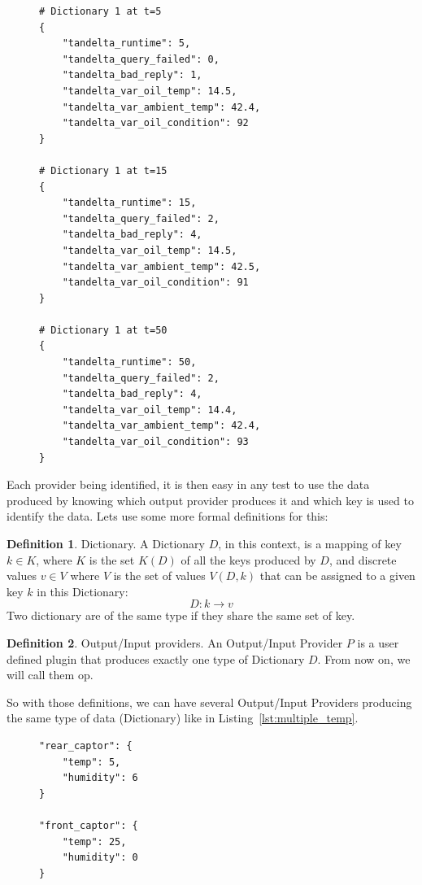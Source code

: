 \documentclass[12pt]{article}
\theoremstyle{definition}
\newtheorem{definition}{Definition}[section]
\theoremstyle{definition}
\theoremstyle{remark}
\begin{document}
\begin{figure}
\label{dictionary_sample}
\begin{lstlisting}[caption=Example of a data dictionnary received at different time.,label={lst:dictionary_sample}]
# Dictionary 1 at t=5
{
    "tandelta_runtime": 5,
    "tandelta_query_failed": 0,
    "tandelta_bad_reply": 1,
    "tandelta_var_oil_temp": 14.5,
    "tandelta_var_ambient_temp": 42.4,
    "tandelta_var_oil_condition": 92
}

# Dictionary 1 at t=15
{
    "tandelta_runtime": 15,
    "tandelta_query_failed": 2,
    "tandelta_bad_reply": 4,
    "tandelta_var_oil_temp": 14.5,
    "tandelta_var_ambient_temp": 42.5,
    "tandelta_var_oil_condition": 91
}

# Dictionary 1 at t=50
{
    "tandelta_runtime": 50,
    "tandelta_query_failed": 2,
    "tandelta_bad_reply": 4,
    "tandelta_var_oil_temp": 14.4,
    "tandelta_var_ambient_temp": 42.4,
    "tandelta_var_oil_condition": 93
}
\end{lstlisting}
\end{figure}

Each provider being identified, it is then easy in any test to use the data produced by knowing which output provider produces it and which key is used to identify the data. Lets use some more formal definitions for this:

\theoremstyle{definition}
\begin{definition}{Dictionary.} A Dictionary $D$, in this context, is a mapping of key $k \in K$, where $K$ is the set $K(D)$ of all the keys produced by $D$, and discrete values $v \in V$ where $V$ is the set of values $V(D, k)$ that can be assigned to a given key $k$ in this Dictionary:
$$D: k \to v$$
Two dictionary are of the same type if they share the same set of key.
\end{definition}

\theoremstyle{definition}
\begin{definition}{Output/Input providers.} An Output/Input Provider $P$ is a user defined plugin that produces exactly one type of Dictionary $D$. From now on, we will call them \gls{op}.
\end{definition}

So with those definitions, we can have several Output/Input Providers producing the same type of data (Dictionary) like in Listing~\ref{lst:multiple_temp}.

\begin{figure}
\label{multiple_temp}
\begin{lstlisting}[caption=Example of a dictionnary that contains the same keys. Each one of them being identified by the name preceding the curly bracket,label={lst:multiple_temp}]
"rear_captor": {
    "temp": 5,
    "humidity": 6
}

"front_captor": {
    "temp": 25,
    "humidity": 0
}
\end{lstlisting}
\end{figure}
\end{document}
